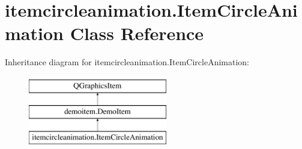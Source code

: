 \hypertarget{classitemcircleanimation_1_1ItemCircleAnimation}{}\section{itemcircleanimation.\+Item\+Circle\+Animation Class Reference}
\label{classitemcircleanimation_1_1ItemCircleAnimation}
Inheritance diagram for itemcircleanimation.\+Item\+Circle\+Animation\+:\begin{figure}[H]
\begin{center}
\leavevmode
\includegraphics[height=3.000000cm]{classitemcircleanimation_1_1ItemCircleAnimation}
\end{center}
\end{figure}
